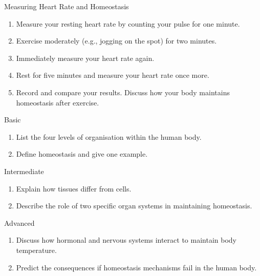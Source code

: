 
\begin{investigation}{Measuring Heart Rate and Homeostasis}
\begin{enumerate}
    \item Measure your resting heart rate by counting your pulse for one minute.
    \item Exercise moderately (e.g., jogging on the spot) for two minutes.
    \item Immediately measure your heart rate again.
    \item Rest for five minutes and measure your heart rate once more.
    \item Record and compare your results. Discuss how your body maintains homeostasis after exercise.
\end{enumerate}
\end{investigation}

\begin{tieredquestions}{Basic}
\begin{enumerate}
    \item List the four levels of organisation within the human body.
    \item Define homeostasis and give one example.
\end{enumerate}
\end{tieredquestions}

\begin{tieredquestions}{Intermediate}
\begin{enumerate}
    \item Explain how tissues differ from cells.
    \item Describe the role of two specific organ systems in maintaining homeostasis.
\end{enumerate}
\end{tieredquestions}

\begin{tieredquestions}{Advanced}
\begin{enumerate}
    \item Discuss how hormonal and nervous systems interact to maintain body temperature.
    \item Predict the consequences if homeostasis mechanisms fail in the human body.
\end{enumerate}
\end{tieredquestions}

